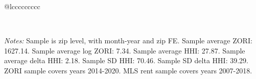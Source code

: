 \begin{table}[H]
{\begin{tabular}{@{\extracolsep{5pt}}lccccccccc}
 \hline  

 \hline \\[-1.8ex]  

  {\parbox[t]{\textwidth}{ \textit{Notes:} Sample is zip level, with month-year and zip FE. Sample average ZORI: 1627.14. Sample average log ZORI: 7.34. Sample average HHI: 27.87. Sample average delta HHI: 2.18. Sample SD HHI: 70.46. Sample SD delta HHI: 39.29. ZORI sample covers years 2014-2020. MLS rent sample covers years 2007-2018.}} \\ 

 \end{tabular}}  

 \end{table}  

 



